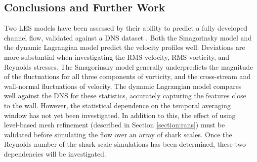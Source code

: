 \documentclass[12pt,oneside,a4paper]{article}
\begin{document}
\subsection{Conclusions and Further Work}
Two LES models have been assessed by their ability to predict a fully developed channel flow, validated against a DNS dataset \citep{vreman2014}. Both the Smagorinsky model \citep{smagorinsky1963} and the dynamic Lagrangian model \citep{meneveau1996} predict the velocity profiles well. Deviations are more substantial when investigating the RMS velocity, RMS vorticity, and Reynolds stresses. The Smagorinsky model generally underpredicts the magnitude of the fluctuations for all three components of vorticity, and the cross-stream and wall-normal fluctuations of velocity. The dynamic Lagrangian model compares well against the DNS for these statistics, accurately capturing the features close to the wall. However, the statistical dependence on the temporal averaging window has not yet been investigated. In addition to this, the effect of using level-based mesh refinement (described in Section \ref{section:rans}) must be validated before simulating the flow over an array of shark scales. Once the Reynolds number of the shark scale simulations has been determined, these two dependencies will be investigated. 
\end{document}
